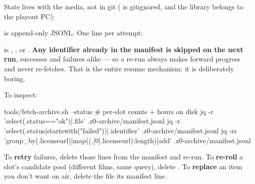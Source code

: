 \documentclass[fontpath=fonts/,logopath=logo/]{riposte-doc}
\begin{document}

State lives with the media, not in git ( is gitignored, and the library belongs to the playout PC):

\ripcodeopen
{}
\ripcodesizereset\ripcodeclose

\textbf{} is append-only JSONL. One line per attempt:

\ripcodeopen
{}
\ripcodesizereset\ripcodeclose

 is , , or . \textbf{Any identifier already in the manifest is skipped on the next run}, successes and failures alike — so a re-run always makes forward progress and never re-fetches. That is the entire resume mechanism; it is deliberately boring.

To inspect:

\ripcodeopen
{}
\begin{ripcodeblock}
tools/fetch-archive.sh --status                      # per-slot counts + hours on disk
jq -r 'select(.status=="ok")|.file' .z0-archive/manifest.jsonl
jq -r 'select(.status|startswith("failed"))|.identifier' .z0-archive/manifest.jsonl
jq -rs 'group_by(.licenseurl)|map({(.[0].licenseurl):length})|add' .z0-archive/manifest.jsonl
\end{ripcodeblock}
\ripcodesizereset\ripcodeclose

To \textbf{retry} failures, delete those lines from the manifest and re-run. To \textbf{re-roll} a slot's candidate pool (different films, same query), delete . To \textbf{replace} an item you don't want on air, delete the file  its manifest line.
\end{document}
